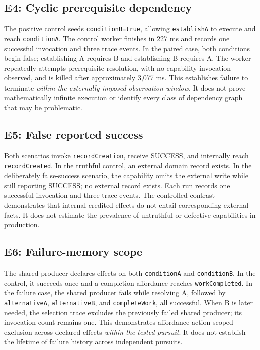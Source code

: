 \documentclass[11pt]{article}
\begin{document}
\subsection{E4: Cyclic prerequisite dependency}
The positive control seeds \texttt{conditionB=true}, allowing \texttt{establishA} to execute and reach \texttt{conditionA}. The control worker finishes in 227 ms and records one successful invocation and three trace events. In the paired case, both conditions begin false; establishing A requires B and establishing B requires A. The worker repeatedly attempts prerequisite resolution, with no capability invocation observed, and is killed after approximately 3,077 ms. This establishes failure to terminate \emph{within the externally imposed observation window}. It does not prove mathematically infinite execution or identify every class of dependency graph that may be problematic.

\subsection{E5: False reported success}
Both scenarios invoke \texttt{recordCreation}, receive SUCCESS, and internally reach \texttt{recordCreated}. In the truthful control, an external domain record exists. In the deliberately false-success scenario, the capability omits the external write while still reporting SUCCESS; no external record exists. Each run records one successful invocation and three trace events. The controlled contrast demonstrates that internal credited effects do not entail corresponding external facts. It does not estimate the prevalence of untruthful or defective capabilities in production.

\subsection{E6: Failure-memory scope}
The shared producer declares effects on both \texttt{conditionA} and \texttt{conditionB}. In the control, it succeeds once and a completion affordance reaches \texttt{workCompleted}. In the failure case, the shared producer fails while resolving A, followed by \texttt{alternativeA}, \texttt{alternativeB}, and \texttt{completeWork}, all successful. When B is later needed, the selection trace excludes the previously failed shared producer; its invocation count remains one. This demonstrates affordance-action-scoped exclusion across declared effects \emph{within the tested pursuit}. It does not establish the lifetime of failure history across independent pursuits.
\end{document}

